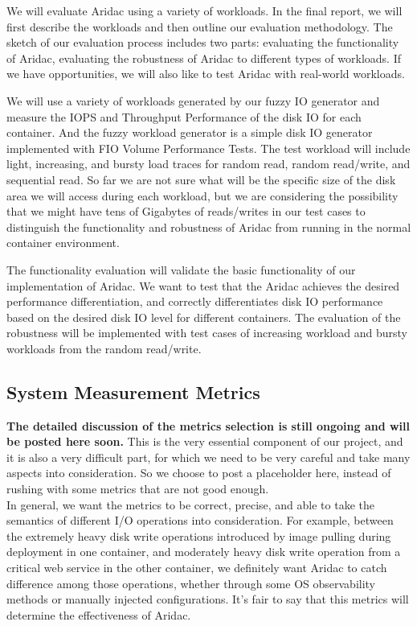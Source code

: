\documentclass[10pt, conference,compsoc]{IEEEtran}
\begin{document}
We will evaluate Aridac using a variety of workloads. In the final report, we will first describe the workloads and then outline our evaluation methodology.  The sketch of our evaluation process includes two parts: evaluating the functionality of Aridac, evaluating the robustness of Aridac to different types of workloads. If we have opportunities, we will also like to test Aridac with real-world workloads.

We will use a variety of workloads generated by our fuzzy IO generator and measure the IOPS and Throughput Performance of the disk IO for each container. And the fuzzy workload generator is a simple disk IO generator implemented with FIO Volume Performance Tests. The test workload will include light, increasing, and bursty load traces for random read, random read/write, and sequential read. So far we are not sure what will be the specific size of the disk area we will access during each workload, but we are considering the possibility that we might have tens of Gigabytes of reads/writes in our test cases to distinguish the functionality and robustness of Aridac from running in the normal container environment. 

The functionality evaluation will validate the basic functionality of our implementation of Aridac. We want to test that the Aridac achieves the desired performance differentiation, and correctly differentiates disk IO performance based on the desired disk IO level for different containers. The evaluation of the robustness will be implemented with test cases of increasing workload and bursty workloads from the random read/write.

\subsection{System Measurement Metrics}

\textbf{The detailed discussion of the metrics selection is still ongoing and will be posted here soon.} This is the very essential component of our project, and it is also a very difficult part, for which we need to be very careful and take many aspects into consideration. So we choose to post a placeholder here, instead of rushing with some metrics that are not good enough.\\

In general, we want the metrics to be correct, precise, and able to take the semantics of different I/O operations into consideration. For example, between the extremely heavy disk write operations introduced by image pulling during deployment in one container, and moderately heavy disk write operation from a critical web service in the other container, we definitely want Aridac to catch difference among those operations, whether through some OS observability methods or manually injected configurations. It's fair to say that this metrics will determine the effectiveness of Aridac.
\end{document}
